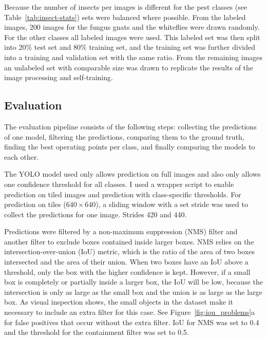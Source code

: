 \documentclass[12pt, a4paper]{article}
\begin{document}
Because the number of insects per images is different for the pest classes (see Table~\ref{tab:insect-stats}) sets were balanced where possible. From the labeled images, 200 images for the fungus gnats and the whiteflies were drawn randomly. For the other classes all labeled images were used. This labeled set was then split into 20\% test set and 80\% training set, and the training set was further divided into a training and validation set with the same ratio. From the remaining images an unlabeled set with comparable size was drawn to replicate the results of the image processing and self-training.

\subsection{Evaluation}
\label{sec:evaluation}



The evaluation pipeline consists of the following steps: collecting the predictions of one model, filtering the predictions, comparing them to the ground truth, finding the best operating points per class, and finally comparing the models to each other.

The YOLO model used only allows prediction on full images and also only allows one confidence threshold for all classes. I used a wrapper script to enable prediction on tiled images and prediction with class-specific thresholds. For prediction on tiles ($640 \times 640$), a sliding window with a set stride was used to collect the predictions for one image. Strides 420 and 440.

Predictions were filtered by a non-maximum suppression (NMS) filter and another filter to exclude boxes contained inside larger boxes. NMS relies on the intersection-over-union (IoU) metric, which is the ratio of the area of two boxes intersected and the area of their union. When two boxes have an IoU above a threshold, only the box with the higher confidence is kept. However, if a small box is completely or partially inside a larger box, the IoU will be low, because the intersection is only as large as the small box and the union is as large as the large box. As visual inspection shows, the small objects in the dataset make it necessary to include an extra filter for this case. See Figure~\ref{fig:iou_problems}a for false positives that occur without the extra filter. IoU for NMS was set to 0.4 and the threshold for the containment filter was set to 0.5.
\end{document}
